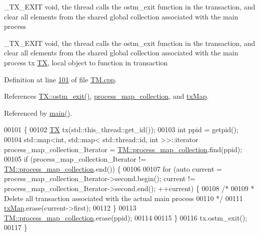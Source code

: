 \+\_\+\+T\+X\+\_\+\+E\+X\+IT void, the thread calls the ostm\+\_\+exit function in the transaction, and clear all elements from the shared global collection associated with the main process 

\+\_\+\+T\+X\+\_\+\+E\+X\+IT void, the thread calls the ostm\+\_\+exit function in the transaction, and clear all elements from the shared global collection associated with the main process  tx \hyperlink{class_t_x}{TX}, local object to function in transaction 

Definition at line \hyperlink{_t_m_8cpp_source_l00101}{101} of file \hyperlink{_t_m_8cpp_source}{T\+M.\+cpp}.



References \hyperlink{_t_x_8cpp_source_l00072}{T\+X\+::ostm\+\_\+exit()}, \hyperlink{_t_m_8h_source_l00106}{process\+\_\+map\+\_\+collection}, and \hyperlink{_t_m_8h_source_l00101}{tx\+Map}.



Referenced by \hyperlink{main_8cpp_source_l00649}{main()}.


\begin{DoxyCode}
00101                  \{
00102     \hyperlink{class_t_x}{TX} tx(std::this\_thread::get\_id());
00103     \textcolor{keywordtype}{int} ppid = getpid();
00104     std::map<int, std::map< std::thread::id, int >>::iterator process\_map\_collection\_Iterator = 
      \hyperlink{class_t_m_a81c3bd28ad2343a620fa070f8ac186ca_a81c3bd28ad2343a620fa070f8ac186ca}{TM::process\_map\_collection}.find(ppid);
00105     \textcolor{keywordflow}{if} (process\_map\_collection\_Iterator != \hyperlink{class_t_m_a81c3bd28ad2343a620fa070f8ac186ca_a81c3bd28ad2343a620fa070f8ac186ca}{TM::process\_map\_collection}.end()) \{
00106 
00107         \textcolor{keywordflow}{for} (\textcolor{keyword}{auto} current = process\_map\_collection\_Iterator->second.begin(); current != 
      process\_map\_collection\_Iterator->second.end(); ++current) \{
00108             \textcolor{comment}{/*}
00109 \textcolor{comment}{             * Delete all transaction associated with the actual main process
}
00110 \textcolor{comment}{             */}
00111             \hyperlink{class_t_m_a0333dfa193ea99d7626de74a2b932e9b_a0333dfa193ea99d7626de74a2b932e9b}{txMap}.erase(current->first);
00112         \}
00113         \hyperlink{class_t_m_a81c3bd28ad2343a620fa070f8ac186ca_a81c3bd28ad2343a620fa070f8ac186ca}{TM::process\_map\_collection}.erase(ppid);
00114 
00115     \}
00116     tx.ostm\_exit();
00117 \}
\end{DoxyCode}


